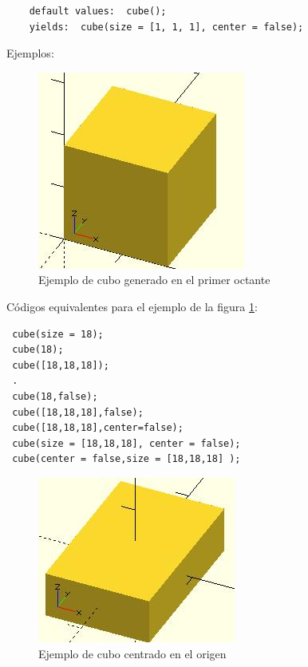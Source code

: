 \documentclass{article}
\begin{document}
\begin{verbatim}
    default values:  cube();  
    yields:  cube(size = [1, 1, 1], center = false);
\end{verbatim}

Ejemplos:\\

\begin{figure}[h!]
    \centering
    \includegraphics[scale=0.5]{Imagenes/OpenSCAD_example_Cube.jpg}
    \caption{Ejemplo de cubo generado en el primer octante}
    \label{fig:cubo_defecto}
\end{figure}

Códigos equivalentes para el ejemplo de la figura \ref{fig:cubo_defecto}:\\

\begin{verbatim}
 cube(size = 18);
 cube(18);
 cube([18,18,18]);
 .
 cube(18,false);
 cube([18,18,18],false);
 cube([18,18,18],center=false);
 cube(size = [18,18,18], center = false);
 cube(center = false,size = [18,18,18] );
\end{verbatim}

\begin{figure}[h!]
    \centering
    \includegraphics[scale=0.5]{Imagenes/OpenSCAD_example_Box.jpg}
    \caption{Ejemplo de cubo centrado en el origen}
    \label{fig:cubo_origen}
\end{figure}
\end{document}
